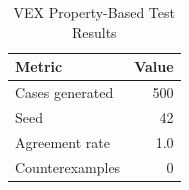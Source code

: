 \begin{table}[htbp]
\caption{VEX Property-Based Test Results}
\label{tab:vex-property}
\centering\small
\begin{tabular}{lr}
\toprule
\textbf{Metric} & \textbf{Value} \\
\midrule
  Cases generated & 500 \\
  Seed & 42 \\
  Agreement rate & 1.0 \\
  Counterexamples & 0 \\
\bottomrule
\end{tabular}
\end{table}
